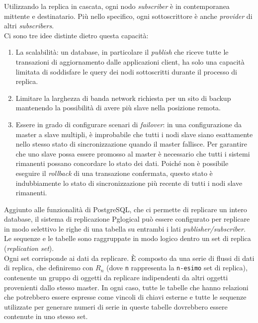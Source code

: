Utilizzando la replica in cascata, ogni nodo \textit{subscriber} \`{e} in contemporanea mittente e destinatario. Pi\`{u} nello specifico, ogni sottoscrittore \`{e} anche \textit{provider} di altri \textit{subscribers}.\\ 
Ci sono tre idee distinte dietro questa capacit\`{a}:
\begin{enumerate}
\item 
La scalabilit\`{a}: un database, in particolare il \textit{publish} che riceve tutte le transazioni di aggiornamento dalle applicazioni client, ha solo una capacit\`{a} limitata di soddisfare le query dei nodi sottoscritti durante il processo di replica. 
\item
Limitare la larghezza di banda network richiesta per un sito di backup mantenendo la possibilit\`{a} di avere pi\`{u} slave nella posizione remota.
\item
Essere in grado di configurare scenari di \textit{failover}: in una configurazione da master a slave multipli, \`{e} improbabile che tutti i nodi slave siano esattamente nello stesso stato di sincronizzazione quando il master fallisce. Per garantire che uno slave possa essere promosso al master \`{e} necessario che tutti i sistemi rimanenti possano concordare lo stato dei dati. Poich\'{e} non \`{e} possibile eseguire il \textit{rollback} di una transazione confermata, questo stato \`{e} indubbiamente lo stato di sincronizzazione pi\`{u} recente di tutti i nodi slave rimanenti.\\
\end{enumerate}
Aggiunto alle funzionalit\`{a} di PostgreSQL, che ci permette di replicare un intero database, il sistema di replicazione Pglogical pu\`{o} essere configurato per replicare in modo selettivo le righe di una tabella su entrambi i lati \textit{publisher/subscriber}.\\
Le sequenze e le tabelle sono raggruppate in modo logico dentro un set di replica (\textit{replication set}). \\
Ogni set corrisponde ai dati da replicare. \`{E} composto da una serie di flussi di dati di replica, che definiremo con $R_n$ (dove \verb"n" rappresenta la \verb"n-esimo" set di replica), contenente un gruppo di oggetti da replicare indipendenti da altri oggetti provenienti dallo stesso master. In ogni caso, tutte le tabelle che hanno relazioni che potrebbero essere espresse come vincoli di chiavi esterne e tutte le sequenze utilizzate per generare numeri di serie in queste tabelle dovrebbero essere contenute in uno stesso set.
